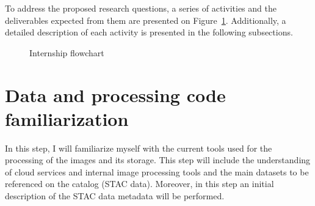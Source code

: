 \documentclass[
  oneside,
  open=any]{scrbook}
\begin{document}
To address the proposed research questions, a series of activities and
the deliverables expected from them are presented on
Figure~\ref{fig-fc}. Additionally, a detailed description of each
activity is presented in the following subsections.

\begin{figure}[H]


\caption{\label{fig-fc}Internship flowchart}

\end{figure}%

\section{Data and processing code
familiarization}\label{data-and-processing-code-familiarization}

In this step, I will familiarize myself with the current tools used for
the processing of the images and its storage. This step will include the
understanding of cloud services and internal image processing tools and
the main datasets to be referenced on the catalog (STAC data). Moreover,
in this step an initial description of the STAC data metadata will be
performed.
\end{document}
